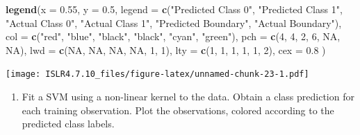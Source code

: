 \documentclass[
]{article}
\newenvironment{Shaded}{\begin{snugshade}}{\end{snugshade}}
\newcommand{\AttributeTok}[1]{\textcolor[rgb]{0.13,0.29,0.53}{#1}}
\newcommand{\ConstantTok}[1]{\textcolor[rgb]{0.56,0.35,0.01}{#1}}
\newcommand{\DecValTok}[1]{\textcolor[rgb]{0.00,0.00,0.81}{#1}}
\newcommand{\FloatTok}[1]{\textcolor[rgb]{0.00,0.00,0.81}{#1}}
\newcommand{\FunctionTok}[1]{\textcolor[rgb]{0.13,0.29,0.53}{\textbf{#1}}}
\newcommand{\NormalTok}[1]{#1}
\newcommand{\StringTok}[1]{\textcolor[rgb]{0.31,0.60,0.02}{#1}}
\providecommand{\tightlist}{%
  \setlength{\itemsep}{0pt}\setlength{\parskip}{0pt}}
\begin{document}
\begin{Shaded}
\begin{Highlighting}[]
\FunctionTok{legend}\NormalTok{(}\AttributeTok{x =} \FloatTok{0.55}\NormalTok{, }\AttributeTok{y =} \FloatTok{0.5}\NormalTok{, }
       \AttributeTok{legend =} \FunctionTok{c}\NormalTok{(}\StringTok{"Predicted Class 0"}\NormalTok{, }\StringTok{"Predicted Class 1"}\NormalTok{, }
                  \StringTok{"Actual Class 0"}\NormalTok{, }\StringTok{"Actual Class 1"}\NormalTok{, }\StringTok{"Predicted Boundary"}\NormalTok{, }\StringTok{"Actual Boundary"}\NormalTok{), }
       \AttributeTok{col =} \FunctionTok{c}\NormalTok{(}\StringTok{"red"}\NormalTok{, }\StringTok{"blue"}\NormalTok{, }\StringTok{"black"}\NormalTok{, }\StringTok{"black"}\NormalTok{, }\StringTok{"cyan"}\NormalTok{, }\StringTok{"green"}\NormalTok{), }
       \AttributeTok{pch =} \FunctionTok{c}\NormalTok{(}\DecValTok{4}\NormalTok{, }\DecValTok{4}\NormalTok{, }\DecValTok{2}\NormalTok{, }\DecValTok{6}\NormalTok{, }\ConstantTok{NA}\NormalTok{, }\ConstantTok{NA}\NormalTok{),}
       \AttributeTok{lwd =} \FunctionTok{c}\NormalTok{(}\ConstantTok{NA}\NormalTok{, }\ConstantTok{NA}\NormalTok{, }\ConstantTok{NA}\NormalTok{, }\ConstantTok{NA}\NormalTok{, }\DecValTok{1}\NormalTok{, }\DecValTok{1}\NormalTok{),}
       \AttributeTok{lty =} \FunctionTok{c}\NormalTok{(}\DecValTok{1}\NormalTok{, }\DecValTok{1}\NormalTok{, }\DecValTok{1}\NormalTok{, }\DecValTok{1}\NormalTok{, }\DecValTok{1}\NormalTok{, }\DecValTok{2}\NormalTok{),}
       \AttributeTok{cex =} \FloatTok{0.8}
\NormalTok{       )}
\end{Highlighting}
\end{Shaded}

\texttt{[image: ISLR4.7.10\_files/figure-latex/unnamed-chunk-23-1.pdf]}

\begin{enumerate}
\def\labelenumi{(\alph{enumi})}
\setcounter{enumi}{7}
\tightlist
\item
  Fit a SVM using a non-linear kernel to the data. Obtain a class
  prediction for each training observation. Plot the observations,
  colored according to the predicted class labels.
\end{enumerate}
\end{document}
